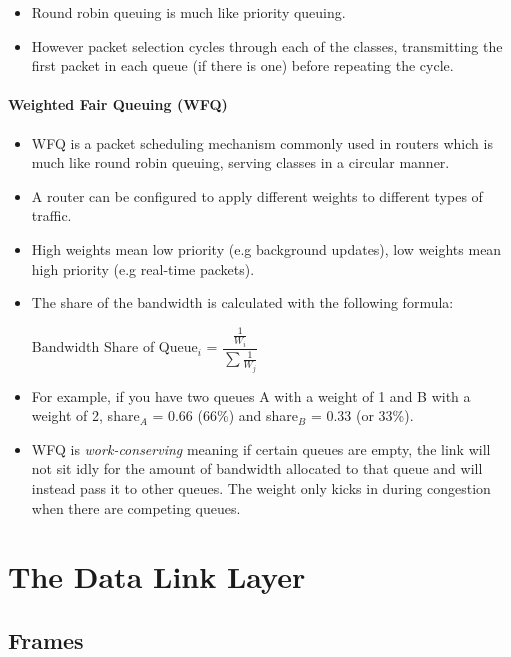\documentclass{article}
\begin{document}
\begin{itemize}
    \item Round robin queuing is much like priority queuing.
    \item However packet selection cycles through each of the classes, transmitting the first packet in each queue (if there is one) before repeating the cycle.
\end{itemize}

\paragraph{Weighted Fair Queuing (WFQ)}

\begin{itemize}
    \item WFQ is a packet scheduling mechanism commonly used in routers which is much like round robin queuing, serving classes in a circular manner.
    \item A router can be configured to apply different weights to different types of traffic.
    \item High weights mean low priority (e.g background updates), low weights mean high priority (e.g real-time packets).
    \item The share of the bandwidth is calculated with the following formula:
    \begin{center}
        Bandwidth Share of Queue$_i$ = $\dfrac{\frac{1}{W_i}}{\sum \frac{1}{W_j}}$
    \end{center}
    \item For example, if you have two queues A with a weight of 1 and B with a weight of 2, share$_A$ = 0.66 (66\%) and share$_B$ = 0.33 (or 33\%).
    \item WFQ is \emph{work-conserving} meaning if certain queues are empty, the link will not sit idly for the amount of bandwidth allocated to that queue and will instead pass it to other queues. The weight only kicks in during congestion when there are competing queues.
\end{itemize}

\section{The Data Link Layer}

\subsection{Frames}
\end{document}

